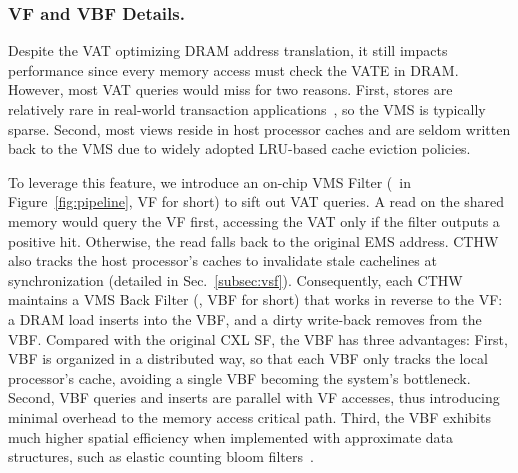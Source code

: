 


\subsubsection{VF and VBF Details. }



Despite the VAT optimizing DRAM address translation, it still impacts performance since every memory access must check the VATE in DRAM. However, most VAT queries would miss for two reasons. First, stores are relatively rare in real-world transaction applications~\cite{snow_osdi16, port_osdi20}, so the VMS is typically sparse. Second, most views reside in host processor caches and are seldom written back to the VMS due to widely adopted LRU-based cache eviction policies.

To leverage this feature, we introduce an on-chip VMS Filter (\onee~in Figure~\ref{fig:pipeline}, VF for short) to sift out VAT queries. A read on the shared memory would query the VF first, accessing the VAT only if the filter outputs a positive hit. Otherwise, the read falls back to the original EMS address. 
CTHW also tracks the host processor's caches to invalidate stale cachelines at synchronization (detailed in Sec.~\ref{subsec:vsf}). Consequently, each CTHW maintains a VMS Back Filter (\twoo, VBF for short) that works in reverse to the VF: a DRAM load inserts into the VBF, and a dirty write-back removes from the VBF. 
Compared with the original CXL SF, the VBF has three advantages:
First, VBF is organized in a distributed way, so that each VBF only tracks the local processor's cache, avoiding a single VBF becoming the system's bottleneck. 
Second, VBF queries and inserts are parallel with VF accesses, thus introducing minimal overhead to the memory access critical path. 
Third, the VBF exhibits much higher spatial efficiency when implemented with approximate data structures, such as elastic counting bloom filters~\cite{elasticbf_tc22}. 


